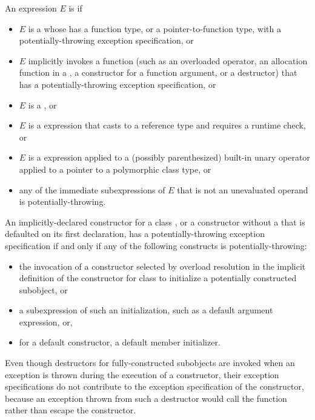 \pnum
An expression $E$ is
 if
\begin{itemize}
\item
$E$ is a 
whose 
has a function type,
or a pointer-to-function type,
with a potentially-throwing exception specification,
or
\item
$E$ implicitly invokes a function
(such as an overloaded operator,
an allocation function in a ,
a constructor for a function argument,
or a destructor)
that has a potentially-throwing exception specification,
or
\item
$E$ is a ,
or
\item
$E$ is a  expression that casts to a reference type and
requires a runtime check,
or
\item
$E$ is a  expression applied to a
(possibly parenthesized) built-in unary \tcode{*} operator
applied to a pointer to a
polymorphic class type,
or
\item
any of the immediate subexpressions
of $E$ that is not an unevaluated operand is potentially-throwing.
\end{itemize}

\pnum
An implicitly-declared constructor for a class ,
or a constructor without a 
that is defaulted on its first declaration,
has a potentially-throwing exception specification
if and only if
any of the following constructs is potentially-throwing:
\begin{itemize}
\item
the invocation of a constructor selected by overload resolution
in the implicit definition of the constructor
for class 
to initialize a potentially constructed subobject, or
\item
a subexpression of such an initialization,
such as a default argument expression, or,
\item
for a default constructor, a default member initializer.
\end{itemize}
\begin{note}
Even though destructors for fully-constructed subobjects
are invoked when an exception is thrown
during the execution of a constructor,
their exception specifications do not contribute
to the exception specification of the constructor,
because an exception thrown from such a destructor
would call the function 
rather than escape the constructor.
\end{note}

